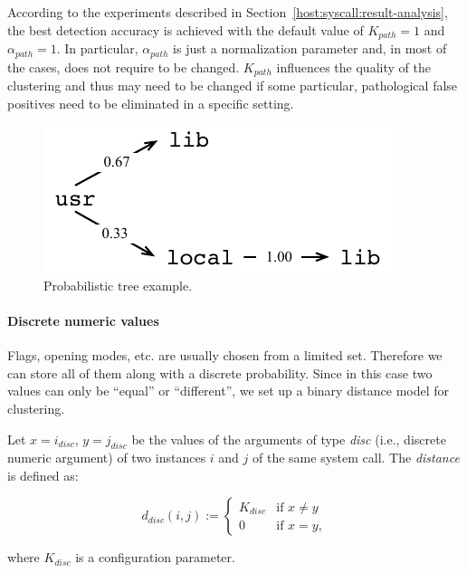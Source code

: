 \begin{note}
  According to the experiments described in
  Section~\ref{host:syscall:result-analysis}, the best detection
  accuracy is achieved with the default value of $K_{path} = 1$ and
  $\alpha_{path} = 1$. In particular, $\alpha_{path}$ is just a
  normalization parameter and, in most of the cases, does not require
  to be changed. $K_{path}$ influences the quality of the clustering
  and thus may need to be changed if some particular, pathological
  false positives need to be eliminated in a specific setting.
\end{note}

\begin{figure}[t]
  \centering
  \includegraphics[scale=.7]{figures/host/syscall/probabilistic_tree}
  \caption{Probabilistic tree example.}
  \label{fig:albero}
\end{figure}

\paragraph{Discrete numeric values}
Flags, opening modes, etc. are usually chosen from a limited
set. Therefore we can store all of them along with a discrete
probability. Since in this case two values can only be ``equal'' or
``different'', we set up a binary distance model for clustering.

\begin{definition}
  Let $x = i_{disc}$, $y = j_{disc}$ be the values of the arguments of
  type \emph{disc} (i.e., discrete numeric argument) of two instances
  $i$ and $j$ of the same system call. The \emph{distance} is defined
  as:

  \begin{displaymath}
    d_{disc}(i,j) := \left\{
      \begin{array}{lll}
        K_{disc} & \mbox{if $x \neq y$}\\
        0 & \mbox{if $x = y$},
    \end{array}
  \right.
\end{displaymath}

where $K_{disc}$ is a configuration parameter.
\end{definition}

